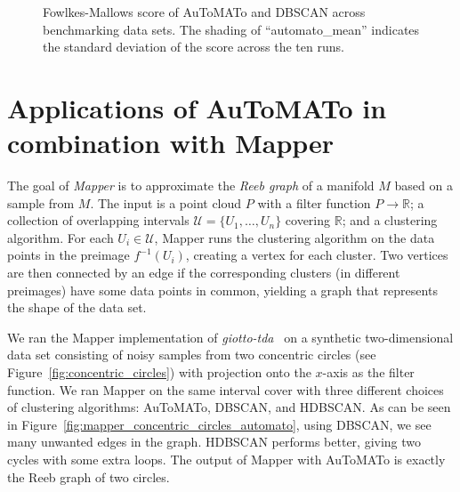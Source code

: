 \documentclass[10pt]{article} %
\theoremstyle{plain}
\newcommand{\RR}{\mathbb{R}}
\newcommand{\aut}{AuToMATo\xspace}
\begin{document}
\begin{figure}[ht]
    \centering
    
    \caption{Fowlkes-Mallows score of \aut and DBSCAN across benchmarking data sets. The shading of ``automato\_mean'' indicates the standard deviation of the score across the ten runs.}
    \label{fig:aut_vs_dbscan_mainbody}
\end{figure}


\section{Applications of \aut in combination with Mapper}\label{sec:sample_application_mapper}

The goal of \emph{Mapper} \citep{singh2007topological} is to approximate the \emph{Reeb graph} of a manifold $M$ based on a sample from $M$. The input is a point cloud $P$ with a filter function $P\rightarrow\RR$; a collection of overlapping intervals $\mathcal{U}=\{U_1,\ldots,U_n\}$ covering $\RR$; and a clustering algorithm. For each $U_i\in\mathcal{U}$, Mapper runs the clustering algorithm on the data points in the preimage $f^{-1}(U_i)$, creating a vertex for each cluster. Two vertices are then connected by an edge if the corresponding clusters (in different preimages) have some data points in common, yielding a graph that represents the shape of the data set.

We ran the Mapper implementation of \emph{giotto-tda}~\citep{giotto-tda} on a synthetic two-dimensional data set consisting of noisy samples from two concentric circles (see Figure~\ref{fig:concentric_circles}) with projection onto the $x$-axis as the filter function.
We ran Mapper on the same interval cover with three different choices of clustering algorithms: \aut, DBSCAN, and HDBSCAN. As can be seen in Figure~\ref{fig:mapper_concentric_circles_automato}, using DBSCAN, we see many unwanted edges in the graph. HDBSCAN performs better, giving two cycles with some extra loops.
The output of Mapper with \aut is exactly the Reeb graph of two circles.
\end{document}
